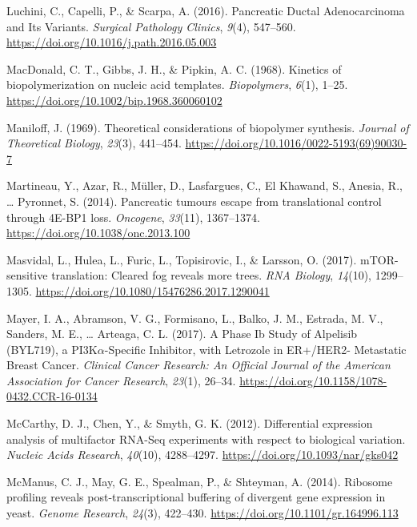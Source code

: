 \documentclass[12pt,openany]{book}
\begin{document}
\hypertarget{ref-Luchini2016}{}
Luchini, C., Capelli, P., \& Scarpa, A. (2016). Pancreatic Ductal
Adenocarcinoma and Its Variants. \emph{Surgical Pathology Clinics},
\emph{9}(4), 547--560. \url{https://doi.org/10.1016/j.path.2016.05.003}

\hypertarget{ref-MacDonald1968a}{}
MacDonald, C. T., Gibbs, J. H., \& Pipkin, A. C. (1968). Kinetics of
biopolymerization on nucleic acid templates. \emph{Biopolymers},
\emph{6}(1), 1--25. \url{https://doi.org/10.1002/bip.1968.360060102}

\hypertarget{ref-Maniloff1969}{}
Maniloff, J. (1969). Theoretical considerations of biopolymer synthesis.
\emph{Journal of Theoretical Biology}, \emph{23}(3), 441--454.
\url{https://doi.org/10.1016/0022-5193(69)90030-7}

\hypertarget{ref-Martineau2014}{}
Martineau, Y., Azar, R., Müller, D., Lasfargues, C., El Khawand, S.,
Anesia, R., \ldots{} Pyronnet, S. (2014). Pancreatic tumours escape from
translational control through 4E-BP1 loss. \emph{Oncogene},
\emph{33}(11), 1367--1374. \url{https://doi.org/10.1038/onc.2013.100}

\hypertarget{ref-Masvidal2017}{}
Masvidal, L., Hulea, L., Furic, L., Topisirovic, I., \& Larsson, O.
(2017). mTOR-sensitive translation: Cleared fog reveals more trees.
\emph{RNA Biology}, \emph{14}(10), 1299--1305.
\url{https://doi.org/10.1080/15476286.2017.1290041}

\hypertarget{ref-Mayer2017}{}
Mayer, I. A., Abramson, V. G., Formisano, L., Balko, J. M., Estrada, M.
V., Sanders, M. E., \ldots{} Arteaga, C. L. (2017). A Phase Ib Study of
Alpelisib (BYL719), a PI3K\(\alpha\)-Specific Inhibitor, with Letrozole
in ER+/HER2- Metastatic Breast Cancer. \emph{Clinical Cancer Research:
An Official Journal of the American Association for Cancer Research},
\emph{23}(1), 26--34.
\url{https://doi.org/10.1158/1078-0432.CCR-16-0134}

\hypertarget{ref-McCarthy2012}{}
McCarthy, D. J., Chen, Y., \& Smyth, G. K. (2012). Differential
expression analysis of multifactor RNA-Seq experiments with respect to
biological variation. \emph{Nucleic Acids Research}, \emph{40}(10),
4288--4297. \url{https://doi.org/10.1093/nar/gks042}

\hypertarget{ref-McManus2014}{}
McManus, C. J., May, G. E., Spealman, P., \& Shteyman, A. (2014).
Ribosome profiling reveals post-transcriptional buffering of divergent
gene expression in yeast. \emph{Genome Research}, \emph{24}(3),
422--430. \url{https://doi.org/10.1101/gr.164996.113}
\end{document}
